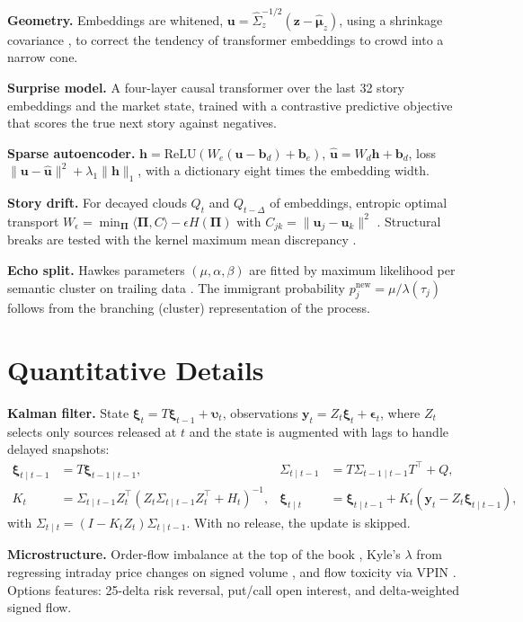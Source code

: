\documentclass[11pt,a4paper]{article}
\theoremstyle{plain}
\theoremstyle{definition}
\newcommand{\z}{\bm{z}}
\begin{document}
\textbf{Geometry.} Embeddings are whitened, $\bm u=\hat\Sigma_z^{-1/2}(\z-\hat{\bm\mu}_z)$, using a shrinkage covariance \citep{ledoit2004}, to correct the tendency of transformer embeddings to crowd into a narrow cone.

\textbf{Surprise model.} A four-layer causal transformer over the last 32 story embeddings and the market state, trained with a contrastive predictive objective \citep{oord2018} that scores the true next story against negatives.

\textbf{Sparse autoencoder.} $\bm h=\mathrm{ReLU}(W_e(\bm u-\bm b_d)+\bm b_e)$, $\hat{\bm u}=W_d\bm h+\bm b_d$, loss $\|\bm u-\hat{\bm u}\|^2+\lambda_1\|\bm h\|_1$, with a dictionary eight times the embedding width.

\textbf{Story drift.} For decayed clouds $Q_t$ and $Q_{t-\Delta}$ of embeddings, entropic optimal transport $W_\epsilon=\min_{\bm\Pi}\langle\bm\Pi,C\rangle-\epsilon H(\bm\Pi)$ with $C_{jk}=\|\bm u_j-\bm u_k\|^2$ \citep{cuturi2013}. Structural breaks are tested with the kernel maximum mean discrepancy \citep{gretton2012}.

\textbf{Echo split.} Hawkes parameters $(\mu,\alpha,\beta)$ are fitted by maximum likelihood per semantic cluster on trailing data \citep{hawkes1971,bacry2015}. The immigrant probability $p^{\text{new}}_j=\mu/\lambda(\tau_j)$ follows from the branching (cluster) representation of the process.

\section{Quantitative Details}\label{app:quant}

\textbf{Kalman filter.} State $\bm\xi_t=T\bm\xi_{t-1}+\bm\upsilon_t$, observations $\bm y_t=Z_t\bm\xi_t+\bm\epsilon_t$, where $Z_t$ selects only sources released at $t$ and the state is augmented with lags to handle delayed snapshots:
\begin{align*}
\bm\xi_{t\mid t-1}&=T\bm\xi_{t-1\mid t-1}, & \Sigma_{t\mid t-1}&=T\Sigma_{t-1\mid t-1}T^\top+Q,\\
K_t&=\Sigma_{t\mid t-1}Z_t^\top(Z_t\Sigma_{t\mid t-1}Z_t^\top+H_t)^{-1}, & \bm\xi_{t\mid t}&=\bm\xi_{t\mid t-1}+K_t(\bm y_t-Z_t\bm\xi_{t\mid t-1}),
\end{align*}
with $\Sigma_{t\mid t}=(I-K_tZ_t)\Sigma_{t\mid t-1}$. With no release, the update is skipped.

\textbf{Microstructure.} Order-flow imbalance at the top of the book \citep{cont2014}, Kyle's $\lambda$ from regressing intraday price changes on signed volume \citep{kyle1985}, and flow toxicity via VPIN \citep{easley2012}. Options features: 25-delta risk reversal, put/call open interest, and delta-weighted signed flow.
\end{document}

